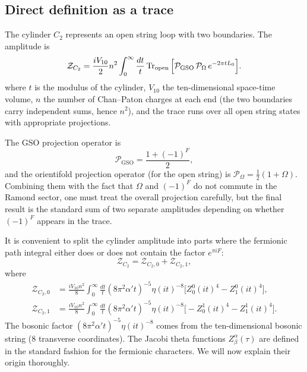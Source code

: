\documentclass[11pt,a4paper]{article}
\begin{document}
\subsection{Direct definition as a trace}
The cylinder $C_2$ represents an open string loop with two boundaries. The amplitude is
\begin{equation}
\mathcal{Z}_{C_2} = \frac{i V_{10}}{2} n^2 \int_0^\infty \frac{dt}{t} 
\Tr_{\text{open}} \Big[ \mathcal{P}_{\text{GSO}} \, \mathcal{P}_\Omega \, e^{-2\pi t L_0} \Big] .
\end{equation}
where $t$ is the modulus of the cylinder, $V_{10}$ the ten-dimensional space-time volume, $n$ the number of Chan–Paton charges at each end (the two boundaries carry independent sums, hence $n^2$), and the trace runs over all open string states with appropriate projections.

The GSO projection operator is
\begin{equation}
\mathcal{P}_{\mathrm{GSO}} = \frac{1 + (-1)^F}{2},
\end{equation}
and the orientifold projection operator (for the open string) is $\mathcal{P}_\Omega = \frac12 (1+\Omega)$. Combining them with the fact that $\Omega$ and $(-1)^F$ do not commute in the Ramond sector, one must treat the overall projection carefully, but the final result is the standard sum of two separate amplitudes depending on whether $(-1)^F$ appears in the trace.

It is convenient to split the cylinder amplitude into parts where the fermionic path integral either does or does not contain the factor $e^{\pi i F}$:
\begin{equation}
\mathcal{Z}_{C_2} = \mathcal{Z}_{C_2,0} + \mathcal{Z}_{C_2,1},
\label{eq:ZC2split}
\end{equation}
where
\begin{align}
\mathcal{Z}_{C_2,0} &= \frac{i V_{10} n^2}{8} \int_0^\infty \frac{dt}{t} (8\pi^2 \alpha' t)^{-5} \eta(it)^{-8} \big[ Z^0_0(it)^4 - Z^0_1(it)^4 \big], \label{eq:ZC20} \\
\mathcal{Z}_{C_2,1} &= \frac{i V_{10} n^2}{8} \int_0^\infty \frac{dt}{t} (8\pi^2 \alpha' t)^{-5} \eta(it)^{-8} \big[ -Z^1_0(it)^4 - Z^1_1(it)^4 \big]. \label{eq:ZC21}
\end{align}
The bosonic factor $(8\pi^2\alpha' t)^{-5} \eta(it)^{-8}$ comes from the ten-dimensional bosonic string (8 transverse coordinates). The Jacobi theta functions $Z^\alpha_\beta(\tau)$ are defined in the standard fashion for the fermionic characters. We will now explain their origin thoroughly.
\end{document}
